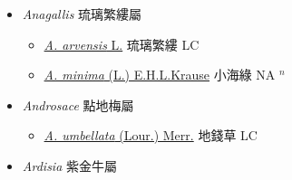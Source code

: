 
  \begin{itemize}
 \item[] \textit{Anagallis} 琉璃繁縷屬
                    
  \begin{itemize}
        \item[] \href{http://www.theplantlist.org/tpl1.1/search?q=Anagallis+arvensis}{\textit{A. arvensis} L.}   琉璃繁縷 LC
        \item[] \href{http://www.theplantlist.org/tpl1.1/search?q=Anagallis+minima}{\textit{A. minima} (L.) E.H.L.Krause}   小海綠 NA $^n$
  \end{itemize}
 \item[] \textit{Androsace} 點地梅屬
                    
  \begin{itemize}
        \item[] \href{http://www.theplantlist.org/tpl1.1/search?q=Androsace+umbellata}{\textit{A. umbellata} (Lour.) Merr.}   地錢草 LC
  \end{itemize}
 \item[] \textit{Ardisia} 紫金牛屬
                    

\end{itemize}
